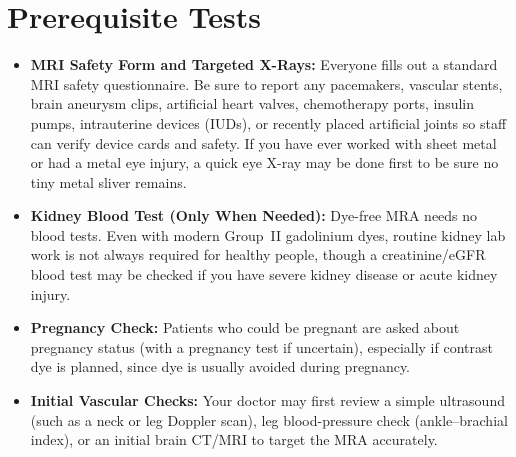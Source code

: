 \section{Prerequisite Tests}
\begin{itemize}
\item \textbf{MRI Safety Form and Targeted X-Rays:} Everyone fills out a standard MRI safety questionnaire. Be sure to report any pacemakers, vascular stents, brain aneurysm clips, artificial heart valves, chemotherapy ports, insulin pumps, intrauterine devices (IUDs), or recently placed artificial joints so staff can verify device cards and safety. If you have ever worked with sheet metal or had a metal eye injury, a quick eye X-ray may be done first to be sure no tiny metal sliver remains.
\item \textbf{Kidney Blood Test (Only When Needed):} Dye-free MRA needs no blood tests. Even with modern Group~II gadolinium dyes, routine kidney lab work is not always required for healthy people, though a creatinine/eGFR blood test may be checked if you have severe kidney disease or acute kidney injury.
\item \textbf{Pregnancy Check:} Patients who could be pregnant are asked about pregnancy status (with a pregnancy test if uncertain), especially if contrast dye is planned, since dye is usually avoided during pregnancy.
\item \textbf{Initial Vascular Checks:} Your doctor may first review a simple ultrasound (such as a neck or leg Doppler scan), leg blood-pressure check (ankle--brachial index), or an initial brain CT/MRI to target the MRA accurately.
\end{itemize}


